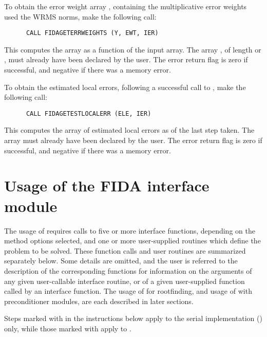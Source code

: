 To obtain the error weight array , containing the multiplicative
error weights used the WRMS norms, make the following call:
\begin{verbatim}
      CALL FIDAGETERRWEIGHTS (Y, EWT, IER)
\end{verbatim}
This computes the  array as a function of the input  array.
The array , of length  or , must already have been
declared by the user.  The error return flag  is zero if successful,
and negative if there was a memory error.

To obtain the estimated local errors, following a successful call to
, make the following call:
\begin{verbatim}
      CALL FIDAGETESTLOCALERR (ELE, IER)
\end{verbatim}
This computes the  array of estimated local errors as of the last
step taken.  The array  must already have been declared by the user.
The error return flag  is zero if successful, and negative if there
was a memory error.

\section{Usage of the FIDA interface module}\label{ss:fida_usage}

The usage of {\fida} requires calls to five or more interface
functions, depending on the method options selected, and one or more
user-supplied routines which define the problem to be solved.  These
function calls and user routines are summarized separately below.
Some details are omitted, and the user is referred to the description
of the corresponding {\ida} functions for information on the arguments 
of any given user-callable interface routine, or of a given user-supplied 
function called by an interface function.
The usage of {\fida} for rootfinding, and usage of {\fida} with
preconditioner modules, are each described in later sections.

Steps marked with {\s} in the instructions below apply to the serial
{\nvector} implementation ({\nvecs}) only, while those marked with {\p}
apply to {\nvecp}.

